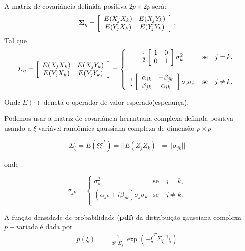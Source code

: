 \documentclass[10pt,a4paper]{article}
\begin{document}
A matriz de covariância definida positiva $2p\times 2p$ será:
$$
{\bf \Sigma_{\eta}} = \left[
\begin{array}{cc}
	E(X_jX_k)  & E(X_jY_k)  \\
	E(Y_jX_k)  & E(Y_jY_k)  \\
\end{array}
\right].
$$
Tal que
$$
{\bf \Sigma_{\eta}} = \left[
\begin{array}{cc}
	E(X_jX_k)  & E(X_jY_k)  \\
	E(Y_jX_k)  & E(Y_jY_k)  \\
\end{array}
\right]= \left\{
\begin{array}{cc}
	\frac{1}{2}\left[
\begin{array}{cc}
	 1 & 0  \\
	 0 & 1  \\
\end{array}
	\right]\sigma^{2}_{k}  & \mbox{se}\quad j=k, \\
	& \\
	\frac{1}{2}\left[
\begin{array}{cc}
	\alpha_{ik} & -\beta_{jk}  \\
	 \beta_{jk} & \alpha_{ik}  \\
\end{array}
	\right]\sigma_j\sigma_k  & \mbox{se}\quad j\neq k.   \\
\end{array}
\right.
$$

Onde $E(\cdot)$ denota o operador de valor esperado(esperança).

Podemos usar a matriz de covariância hermitiana complexa definida positiva usando a $\xi$ variável randômica gaussiana complexa de dimensão $p\times p$

$$\Sigma_{\xi}=E(\xi\bar{\xi}^{T})=||E(Z_j\bar{Z}_k)||=||\sigma_{jk}||$$

onde

$$
\sigma_{jk} = \left\{
\begin{array}{cc}
	\sigma_k^2                                & \mbox{se}\quad j=k,  \\
	(\alpha_{jk}+i\beta_{jk})\sigma_j\sigma_k & \mbox{se}\quad j\neq k. \\
\end{array}
\right.
$$

A função densidade de probabilidade ({\bf pdf}) da distribuição gaussiana complexa $p-$variada é dada por
\begin{equation}\label{sec2eqn1}
\begin{array}{ccc}
	p(\xi)&=&\frac{1}{\pi^p|\Sigma_{\xi}|}\exp(-\bar{\xi}^{T}\Sigma_{\xi}^{-1}\xi)  \\
\end{array}
\end{equation}
\end{document}
